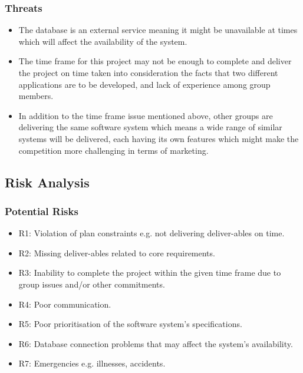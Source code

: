 \documentclass{article}
\begin{document}
\subsubsection{Threats}
\begin{itemize}
\item The database is an external service meaning it might be unavailable at times which will affect the availability of the system. 
\item The time frame for this project may not be enough to complete and deliver the project on time taken into consideration the facts that two different applications are to be developed, and lack of experience among group members. 
\item In addition to the time frame issue mentioned above, other groups are delivering the same software system which means a wide range of similar systems will be delivered, each having its own features which might make the competition more challenging in terms of marketing. 
\end{itemize}

\subsection{Risk Analysis}
\subsubsection{Potential Risks}
\begin{itemize}
\item R1: Violation of plan constraints e.g. not delivering deliver-ables on time.
\item R2: Missing deliver-ables related to core requirements. 
\item R3: Inability to complete the project within the given time frame due to group issues and/or other commitments.
\item R4: Poor communication.
\item R5: Poor prioritisation of the software system’s specifications.
\item R6: Database connection problems that may affect the system’s availability.
\item R7: Emergencies e.g. illnesses, accidents. 
\end{itemize}
\end{document}
